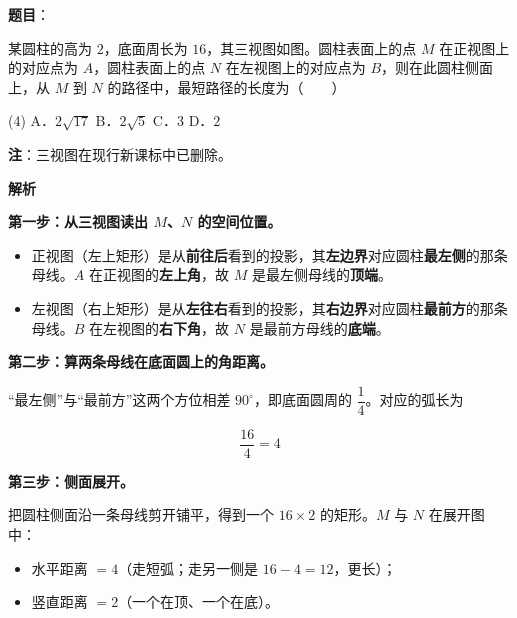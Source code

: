 \begin{answer}

\textbf{题目}：

某圆柱的高为 $2$，底面周长为 $16$，其三视图如图。圆柱表面上的点 $M$ 在正视图上的对应点为 $A$，圆柱表面上的点 $N$ 在左视图上的对应点为 $B$，则在此圆柱侧面上，从 $M$ 到 $N$ 的路径中，最短路径的长度为\mbox{（　　）}
\nopagebreak[4]
\begin{center}\end{center}
\nopagebreak[4]
\begin{gkopts}(4)
\task A．$2\sqrt{17}$
\task B．$2\sqrt5$
\task C．$3$
\task D．$2$
\end{gkopts}

\begin{gktip}
\textbf{注}：三视图在现行新课标中已删除。
\end{gktip}

\textbf{解析}

\textbf{第一步：从三视图读出 $M$、$N$ 的空间位置。}

\begin{itemize}
\item 正视图（左上矩形）是从\textbf{前往后}看到的投影，其\textbf{左边界}对应圆柱\textbf{最左侧}的那条母线。$A$ 在正视图的\textbf{左上角}，故 $M$ 是最左侧母线的\textbf{顶端}。
\item 左视图（右上矩形）是从\textbf{左往右}看到的投影，其\textbf{右边界}对应圆柱\textbf{最前方}的那条母线。$B$ 在左视图的\textbf{右下角}，故 $N$ 是最前方母线的\textbf{底端}。
\end{itemize}

\Needspace{0.25\textheight}

\textbf{第二步：算两条母线在底面圆上的角距离。}

“最左侧”与“最前方”这两个方位相差 $90^\circ$，即底面圆周的 $\dfrac14$。对应的弧长为

\nopagebreak[4]
\[\frac{16}4=4\]

\textbf{第三步：侧面展开。}

把圆柱侧面沿一条母线剪开铺平，得到一个 $16\times2$ 的矩形。$M$ 与 $N$ 在展开图中：

\begin{itemize}
\item 水平距离 $=4$（走短弧；走另一侧是 $16-4=12$，更长）；
\item 竖直距离 $=2$（一个在顶、一个在底）。
\end{itemize}


\end{answer}
